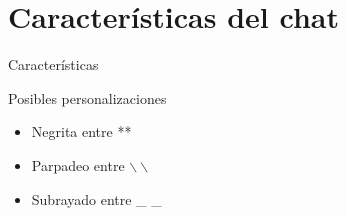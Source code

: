 \section{Características del chat}



\begin{frame}{Características}

	\begin{block}{Posibles personalizaciones}
		\begin{itemize}
			\item Negrita entre **
			\item Parpadeo entre $\backslash \backslash$
			\item Subrayado entre \_ \_
		\end{itemize}
	\end{block}

\end{frame}